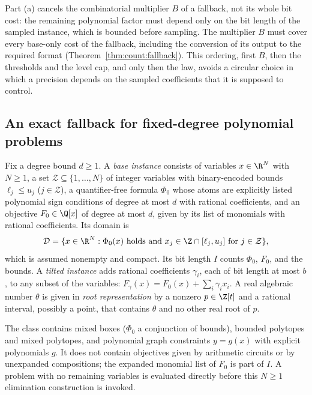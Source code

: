 Part (a) cancels the combinatorial multiplier $B$ of a fallback, not its
whole bit cost: the remaining polynomial factor must depend only on the bit
length of the sampled instance, which is bounded before sampling. The
multiplier $B$ must cover every base-only cost of the fallback, including the
conversion of its output to the required format
(Theorem~\ref{thm:count:fallback}). This ordering, first $B$, then the
thresholds and the level cap, and only then the law, avoids a circular choice
in which a precision depends on the sampled coefficients that it is supposed
to control.

\subsection{An exact fallback for fixed-degree polynomial problems}\label{sec:count:fallback}

\begin{definition}\label{def:count:semialg}
Fix a degree bound $d\ge1$. A \emph{base instance} consists of variables
$x\in\R^N$ with $N\ge1$, a set $\mathcal Z\subseteq\{1,\dots,N\}$ of integer variables
with binary-encoded bounds $\ell_j\le u_j$ ($j\in\mathcal Z$), a
quantifier-free formula $\Phi_0$ whose atoms are explicitly listed polynomial
sign conditions of degree at most $d$ with rational coefficients, and an
objective $F_0\in\Q[x]$ of degree at most $d$, given by its list of monomials
with rational coefficients. Its domain is
\[
 \mathcal D=\{x\in\R^N:\Phi_0(x)\text{ holds and }
 x_j\in\Z\cap[\ell_j,u_j]\text{ for }j\in\mathcal Z\},
\]
which is assumed nonempty and compact. Its bit length $I$ counts $\Phi_0$,
$F_0$, and the bounds. A \emph{tilted instance} adds rational coefficients
$\gamma_i$, each of bit length at most $b$, to any subset of the variables:
$F_\gamma(x)=F_0(x)+\sum_i\gamma_ix_i$. A real algebraic number $\theta$ is
given in \emph{root representation} by a nonzero $p\in\Z[t]$ and a rational
interval, possibly a point, that contains $\theta$ and no other real root of
$p$.
\end{definition}

The class contains mixed boxes ($\Phi_0$ a conjunction of bounds), bounded
polytopes and mixed polytopes, and polynomial graph constraints $y=g(x)$
with explicit polynomials $g$. It does not contain objectives given by
arithmetic circuits or by unexpanded compositions; the expanded monomial
list of $F_0$ is part of $I$. A problem with no remaining variables is
evaluated directly before this $N\ge1$ elimination construction is invoked.

